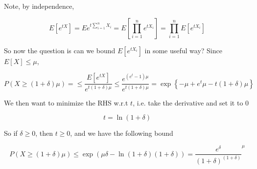 \documentclass[../notes.tex]{subfiles}
\begin{document}

Note, by independence, 

\begin{equation}
    E[e^{tX}] = E e^{t\sum^n_{i=1} X_i}  = E \left[ \prod^n_{i=1} e^{tX_i} \right] = \prod^n_{i=1} E[e^{tX_i}]
\end{equation}


So now the question is can we bound $ E[e^{tX_i}] $ in some useful way?
Since $ E[X] \le  \mu $,

\begin{equation}
    P(X \ge (1+\delta) \mu) = \le \frac{E[e^{tX}]}{e^{t(1+\delta)\mu}} \le  \frac{e^{(e^t - 1)\mu}}{e^{t(1+\delta)\mu}} = \exp \left\{ -\mu + e^t \mu - t(1+\delta) \mu \right\} 
\end{equation}

We then want to minimize the RHS w.r.t $ t $, i.e. take the derivative and set it to 0

\begin{equation}
    t = \ln (1+\delta)
\end{equation}

So if $ \delta \ge 0  $, then $ t \ge 0 $, and we have the following bound

\begin{equation}
    P(X \ge  (1+\delta)\mu) \le  \exp \left( \mu \delta - \ln (1+\delta) (1+\delta) \right)  = \frac{e^\delta}{(1+\delta)^{(1+\delta)}}^\mu
\end{equation}
\end{document}
